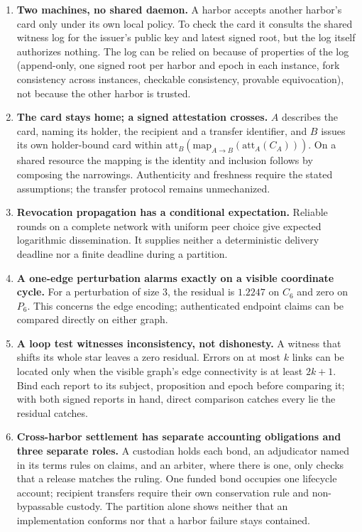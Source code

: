 \documentclass[11pt,a4paper]{article}
\theoremstyle{definition}
\theoremstyle{remark}
\begin{document}
\begin{enumerate}[leftmargin=1.6em,itemsep=2pt]
\item \textbf{Two machines, no shared daemon.} A harbor accepts another harbor's card only under its own local policy. To check the card it consults the shared witness log for the issuer's public key and latest signed root, but the log itself authorizes nothing. The log can be relied on because of properties of the log (append-only, one signed root per harbor and epoch in each instance, fork consistency across instances, checkable consistency, provable equivocation), not because the other harbor is trusted.
\item \textbf{The card stays home; a signed attestation crosses.} $A$ describes the card, naming its holder, the recipient and a transfer identifier, and $B$ issues its own holder-bound card within $\mathrm{att}_B(\mathrm{map}_{A\to B}(\mathrm{att}_A(C_A)))$. On a shared resource the mapping is the identity and inclusion follows by composing the narrowings. Authenticity and freshness require the stated assumptions; the transfer protocol remains unmechanized.
\item \textbf{Revocation propagation has a conditional expectation.} Reliable rounds on a complete network with uniform peer choice give expected logarithmic dissemination. It supplies neither a deterministic delivery deadline nor a finite deadline during a partition.
\item \textbf{A one-edge perturbation alarms exactly on a visible coordinate cycle.} For a perturbation of size $3$, the residual is $1.2247$ on $C_6$ and zero on $P_6$. This concerns the edge encoding; authenticated endpoint claims can be compared directly on either graph.
\item \textbf{A loop test witnesses inconsistency, not dishonesty.} A witness that shifts its whole star leaves a zero residual. Errors on at most $k$ links can be located only when the visible graph's edge connectivity is at least $2k+1$. Bind each report to its subject, proposition and epoch before comparing it; with both signed reports in hand, direct comparison catches every lie the residual catches.
\item \textbf{Cross-harbor settlement has separate accounting obligations and three separate roles.} A custodian holds each bond, an adjudicator named in its terms rules on claims, and an arbiter, where there is one, only checks that a release matches the ruling. One funded bond occupies one lifecycle account; recipient transfers require their own conservation rule and non-bypassable custody. The partition alone shows neither that an implementation conforms nor that a harbor failure stays contained.

\end{enumerate}
\end{document}
